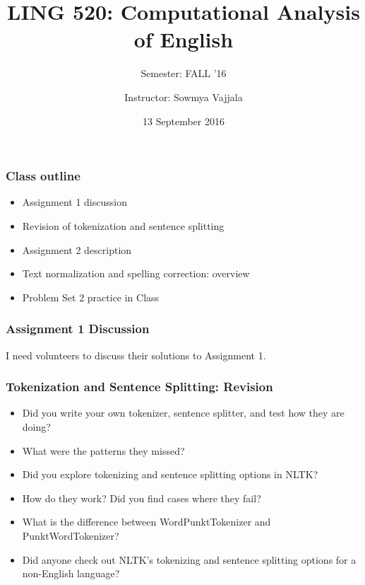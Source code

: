 \documentclass{beamer}
\author[Sowmya Vajjala]{Instructor: Sowmya Vajjala}
\title[LING 520]{LING 520: Computational Analysis of English}
\subtitle{Semester: FALL '16}
\date{13 September 2016}
\institute{Iowa State University, USA}
\begin{document}
\begin{frame}\titlepage
\end{frame}


\begin{frame}
\frametitle{Class outline}
\begin{itemize}
\item Assignment 1 discussion
\item Revision of tokenization and sentence splitting
\item Assignment 2 description
\item Text normalization and spelling correction: overview
\item Problem Set 2 practice in Class
\end{itemize}
\end{frame}

\begin{frame}
\frametitle{Assignment 1 Discussion}
I need volunteers to discuss their solutions to Assignment 1.
\end{frame}%

\begin{frame}
\frametitle{Tokenization and Sentence Splitting: Revision}
\begin{itemize}
\item Did you write your own tokenizer, sentence splitter, and test how they are doing? 
\item What were the patterns they missed? \pause
\item Did you explore tokenizing and sentence splitting options in NLTK?
\item How do they work? Did you find cases where they fail? 
\pause \item What is the difference between WordPunktTokenizer and PunktWordTokenizer? \pause
\item Did anyone check out NLTK's tokenizing and sentence splitting options for a non-English language?
\end{itemize}
\end{frame}
\end{document}
